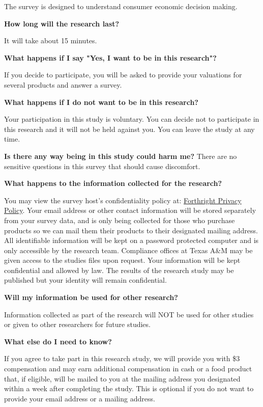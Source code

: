 \documentclass[12pt]{article}
\begin{document}
The survey is designed to understand consumer economic decision making. \par

\textbf{How long will the research last?} \par
It will take about 15 minutes. \par
\textbf{What happens if I say "Yes, I want to be in this research"?} \par
If you decide to participate, you will be asked to provide your valuations for several products and answer a survey. \par


\textbf{
What happens if I do not want to be in this research?} \par
Your participation in this study is voluntary. You can decide not to participate in this research and it will not be held against you. You can leave the study at any time. \par

\textbf{Is there any way being in this study could harm me?}
There are no sensitive questions in this survey that should cause discomfort. \par

\textbf{What happens to the information collected for the research?} \par
You may view the survey host’s confidentiality policy at: \href{https://www.beforthright.com/privacy}{Forthright Privacy Policy}. Your email address or other contact information will be stored separately from your survey data, and is only being collected for those who purchase products so we can mail them their products to their designated mailing address. All identifiable information will be kept on a password protected computer and is only accessible by the research team. Compliance offices at Texas A\&M may be given access to the studies files upon request. Your information will be kept confidential and allowed by law. The results of the research study may be published but your identity will remain confidential. \par

\textbf{Will my information be used for other research?} \par
Information collected as part of the research will NOT be used for other studies or given to other researchers for future studies. \par

\textbf{What else do I need to know?} \par

If you agree to take part in this research study, we will provide you with  \$3 compensation and may earn additional compensation in cash or a food product that, if eligible, will be mailed to you at the mailing address you designated within a week after completing the study. This is optional if you do not want to provide your email address or a mailing address. \par
\end{document}
